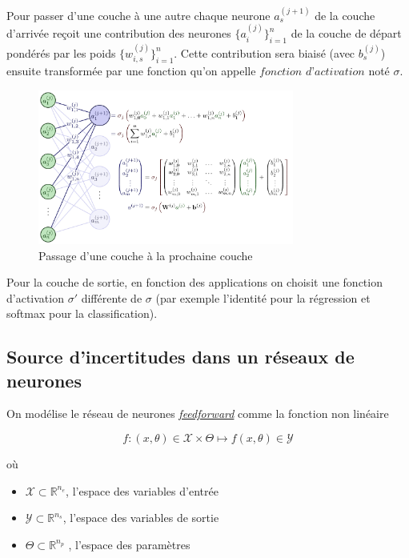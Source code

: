 \documentclass[french,12pt]{article}
\let\oldsubsection\subsection%
\renewcommand{\subsection}{%
  \renewcommand{\theequation}{\thesubsection.\arabic{equation}}%
  \oldsubsection}%
\begin{document}
Pour passer d'une couche à une autre chaque neurone $a^{(j + 1)}_s$ de la couche d'arrivée reçoit une contribution
des neurones $\{a^{(j)}_i\}_{i = 1}^n$ de la couche de départ pondérés par les poids
$\{w^{(j)}_{i,s}\}_{i = 1}^n$. Cette contribution sera biaisé (avec $b^{(j)}_s$) ensuite transformée par une fonction
qu'on appelle $\textit{fonction d'activation}$ noté $\sigma$.

\begin{figure}[H]
    \centerline{\includegraphics[width = 0.75\textwidth]{FNN/Images/fnnDetails/fnnDetails_page-0001.jpg}}
    \caption{Passage d'une couche à la prochaine couche \cite{NeetGraph}}
    \label{fig:fnnDetails}
\end{figure}

Pour la couche de sortie, en fonction des applications on choisit une fonction d'activation $\sigma'$
différente de $\sigma$ (par exemple l'identité pour la régression et softmax pour la classification).

\subsection{Source d'incertitudes dans un réseaux de neurones}

On modélise le réseau de neurones \href{https://en.wikipedia.org/wiki/Feedforward_neural_network}{\textit{feedforward}} comme la fonction non linéaire

\begin{equation}
    f : (x, \theta) \in \mathcal{X} \times \Theta \mapsto f(x, \theta) \in \mathcal{Y}  
\end{equation}

où

\begin{itemize}
    \item $\mathcal{X} \subset \mathbb{R}^{n_e}$, l'espace des variables d'entrée
    \item $\mathcal{Y} \subset \mathbb{R}^{n_s}$, l'espace des variables de sortie
    \item $\Theta \subset \mathbb{R}^{n_p}$ , l'espace des paramètres
\end{itemize}
\end{document}
